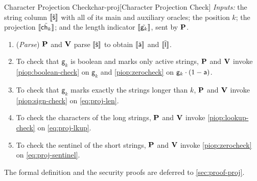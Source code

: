 \begin{DefinePIOP}{Character Projection Check}{char-proj}[Character Projection Check]
  \emph{Inputs:} the string column $\llbracket\hat{\mathsf{s}}\rrbracket$ with all of its main and auxiliary oracles; the position $k$; the projection $\llbracket\tilde{\mathsf{ch}_k}\rrbracket$; and the length indicator $\llbracket\tilde{\mathsf{g}_k}\rrbracket$, sent by $\bf{P}$.
  \begin{enumerate}[nosep]
    \item (\emph{Parse}) $\bf{P}$ and $\bf{V}$ parse $\llbracket\hat{\mathsf{s}}\rrbracket$ to obtain $\llbracket\tilde{\mathsf{a}}\rrbracket$ and $\llbracket\tilde{\mathsf{l}}\rrbracket$.
    \item To check that $\mathsf{g}_k$ is boolean and marks only active strings, $\bf{P}$ and $\bf{V}$ invoke \cref{piop:boolean-check} on $\mathsf{g}_k$ and \cref{piop:zerocheck} on $\mathsf{g}_k \cdot (1 - \mathsf{a})$.
    \item To check that $\mathsf{g}_k$ marks exactly the strings longer than $k$, $\bf{P}$ and $\bf{V}$ invoke \cref{piop:sign-check} on \cref{eq:proj-len}.
    \item To check the characters of the long strings, $\bf{P}$ and $\bf{V}$ invoke \cref{piop:lookup-check} on \cref{eq:proj-lkup}.
    \item To check the sentinel of the short strings, $\bf{P}$ and $\bf{V}$ invoke \cref{piop:zerocheck} on \cref{eq:proj-sentinel}.
  \end{enumerate}
\end{DefinePIOP}
The formal definition and the security proofs are deferred to \cref{sec:proof-proj}.
